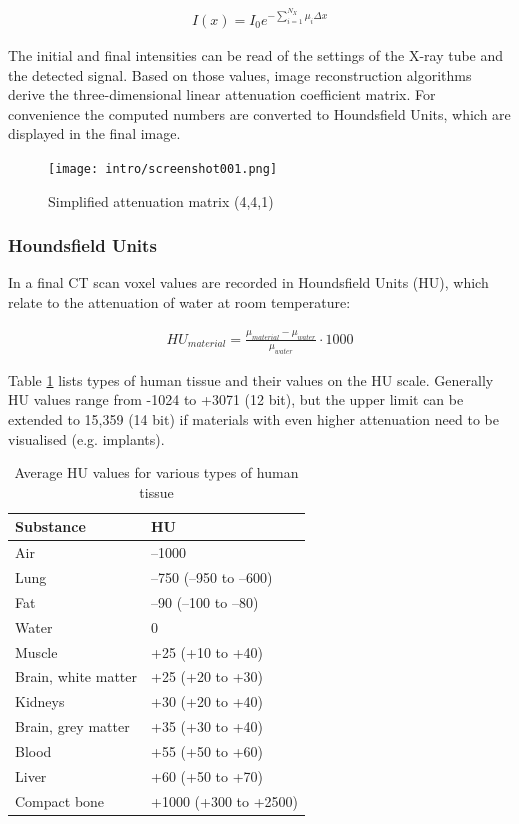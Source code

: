 \begin{align}
\label{eq:mu_sum}
I(x) = I_0 e^{- \sum\limits_{i=1}^{N_X} \mu_i \Delta x}
\end{align}

The initial and final intensities can be read of the settings of the X-ray tube and the detected signal.
Based on those values, image reconstruction algorithms derive the three-dimensional linear attenuation coefficient matrix.
For convenience the computed numbers are converted to Houndsfield Units, which are displayed in the final image.

\begin{figure}[!htb]
	\centering
	\texttt{[image: intro/screenshot001.png]}
	\caption{Simplified attenuation matrix (4,4,1)}
	\label{fig:voxel_matrix}
\end{figure}

\subsubsection{Houndsfield Units}

In a final CT scan voxel values are recorded in Houndsfield Units (HU), which relate to the attenuation of water at room temperature:

\begin{align}
HU_{material} = \frac{\mu_{material} - \mu_{water}}{\mu_{water}} \cdot 1000
\end{align}

Table \ref{tab:HU} lists types of human tissue and their values on the HU scale.
Generally HU values range from -1024 to +3071 (12 bit), but the upper limit can be extended to 15,359 (14 bit) if materials with even higher attenuation need to be visualised (e.g. implants).

\begin{table}[]
	\centering
	\caption{Average HU values for various types of human tissue}
	\label{tab:HU}
	\begin{tabular}{@{}ll@{}}
		\toprule
		Substance           & HU                     \\ \midrule
		Air                 & –1000                  \\
		Lung                & –750 (–950 to –600)    \\
		Fat                 & –90 (–100 to –80)      \\
		Water               & 0                      \\
		Muscle              & +25 (+10 to +40)       \\
		Brain, white matter & +25 (+20 to +30)       \\
		Kidneys             & +30 (+20 to +40)       \\
		Brain, grey matter  & +35 (+30 to +40)       \\
		Blood               & +55 (+50 to +60)       \\
		Liver               & +60 (+50 to +70)       \\
		Compact bone        & +1000 (+300 to +2500)  \\ \bottomrule
	\end{tabular}
\end{table}

